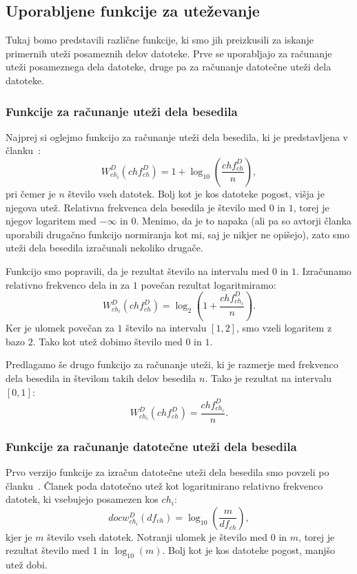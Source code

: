 \documentclass{acm_proc_article-sp}
\begin{document}
\subsection{Uporabljene funkcije za uteževanje}
\label{weight-functions}

Tukaj bomo predstavili različne funkcije, ki smo jih preizkusili za iskanje primernih uteži posameznih delov datoteke. Prve se uporabljajo za računanje uteži posameznega dela datoteke, druge pa za računanje datotečne uteži dela datoteke.

\subsubsection{Funkcije za računanje uteži dela besedila}\label{utezivclanku}
Najprej si oglejmo funkcijo za računanje uteži dela besedila, ki je predstavljena v članku~\cite{fbhash}:
\[ W_{ch_i}^{D}(ch f_{ch}^D) = 1 + \log_{10}\left(\frac{ch f_{ch}^D}{n}\right),\]
pri čemer je $n$ število vseh datotek. Bolj kot je kos datoteke pogost, višja je njegova utež. Relativna frekvenca dela besedila je število med $0$ in $1$, torej je njegov logaritem med $-\infty$ in $0$. Menimo, da je to napaka (ali pa so avtorji članka uporabili drugačno funkcijo normiranja kot mi, saj je nikjer ne opišejo), zato smo uteži dela besedila izračunali nekoliko drugače.

Funkcijo smo popravili, da je rezultat število na intervalu med $0$ in $1$. Izračunamo relativno frekvenco dela in za $1$ povečan rezultat logaritmiramo:
\[ W_{ch_i}^{D}(ch f_{ch}^D) = \log_2\left(1 + \frac{ch f_{ch_i}^D}{n}\right). \]
Ker je ulomek povečan za $1$ število na intervalu $[1, 2]$, smo vzeli logaritem z bazo $2$. Tako kot utež dobimo število med $0$ in $1$. 

Predlagamo še drugo funkcijo za računanje uteži, ki je razmerje med frekvenco dela besedila in številom takih delov besedila $n$. Tako je rezultat na intervalu $[0,1]$:
\[ W_{ch_i}^{D}(ch f_{ch}^D) = \frac{ch f_{ch_i}^D}{n}. \]

\subsubsection{Funkcije za računanje datotečne uteži dela besedila}
Prvo verzijo funkcije za izračun datotečne uteži dela besedila smo povzeli po članku~\cite{fbhash}. Članek poda datotečno utež kot logaritmirano relativno frekvenco datotek, ki vsebujejo posamezen kos $ch_i$:
\[ docw_{ch_i}^{D}(df_{ch}) = \log_{10}\left(\frac{m}{df_{ch}}\right), \]
kjer je $m$ število vseh datotek. Notranji ulomek je število med $0$ in $m$, torej je rezultat število med $1$ in $\log_{10}(m)$. Bolj kot je kos datoteke pogost, manjšo utež dobi.
\end{document}
